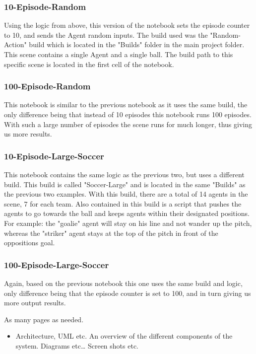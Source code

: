\subsubsection{10-Episode-Random}
Using the logic from above, this version of the notebook sets the episode counter to 10, and sends the Agent random inputs. The build used was the "Random-Action" build which is located in the "Builds" folder in the main project folder. This scene contains a single Agent and a single ball. The build path to this specific scene is located in the first cell of the notebook. 

\subsubsection{100-Episode-Random}
This notebook is similar to the previous notebook as it uses the same build, the only difference being that instead of 10 episodes this notebook runs 100 episodes. With such a large number of episodes the scene runs for much longer, thus giving us more results.

\subsubsection{10-Episode-Large-Soccer}
This notebook contains the same logic as the previous two, but uses a different build. This build is called "Soccer-Large" and is located in the same "Builds" as the previous two examples. With this build, there are a total of 14 agents in the scene, 7 for each team. Also contained in this build is a script that pushes the agents to go towards the ball and keeps agents within their designated positions. For example: the "goalie" agent will stay on his line and not wander up the pitch, whereas the "striker" agent stays at the top of the pitch in front of the oppositions goal.

\subsubsection{100-Episode-Large-Soccer}
Again, based on the previous notebook this one uses the same build and logic, only difference being that the episode counter is set to 100, and in turn giving us more output results.

As many pages as needed.
\begin{itemize}
\item Architecture, UML etc. An overview of the different components of the system. Diagrams etc… Screen shots etc.
\end{itemize}
